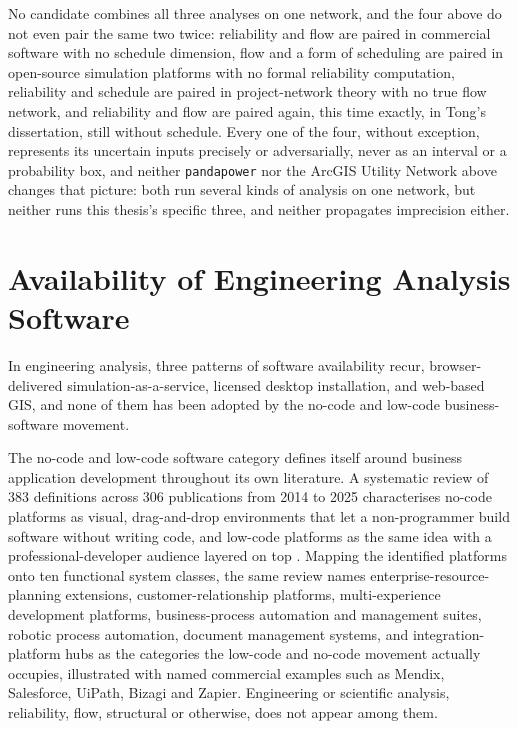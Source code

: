 \documentclass[12pt]{report}
\begin{document}
No candidate combines all three analyses on one network, and the four above do not even pair the
same two twice: reliability and flow are paired in commercial software with no schedule
dimension, flow and a form of scheduling are paired in open-source simulation platforms with no
formal reliability computation, reliability and schedule are paired in project-network theory
with no true flow network, and reliability and flow are paired again, this time exactly, in
Tong's dissertation, still without schedule. Every one of the four, without exception, represents
its uncertain inputs precisely or adversarially, never as an interval or a probability box, and
neither \texttt{pandapower} nor the {ArcGIS} Utility Network above changes that picture: both run
several kinds of analysis on one network, but neither runs this thesis's specific three, and
neither propagates imprecision either.

\section{Availability of Engineering Analysis Software}
\label{sec:bg-delivery}

In engineering analysis, three patterns of software availability recur, browser-delivered
simulation-as-a-service, licensed desktop installation, and web-based {GIS}, and none of them
has been adopted by the no-code and low-code business-software movement.

The no-code and low-code software category defines itself around business application
development throughout its own literature. A systematic review of 383 definitions across 306
publications from 2014 to 2025 characterises no-code platforms as visual, drag-and-drop
environments that let a non-programmer build software without writing code, and low-code
platforms as the same idea with a professional-developer audience layered on top
\cite{abendroth2026democratization}. Mapping the identified platforms onto ten functional system
classes, the same review names enterprise-resource-planning extensions, customer-relationship
platforms, multi-experience development platforms, business-process automation and management
suites, robotic process automation, document management systems, and integration-platform hubs
as the categories the low-code and no-code movement actually occupies, illustrated with named
commercial examples such as Mendix, Salesforce, UiPath, Bizagi and Zapier. Engineering or
scientific analysis, reliability, flow, structural or otherwise, does not appear among them.
\end{document}
